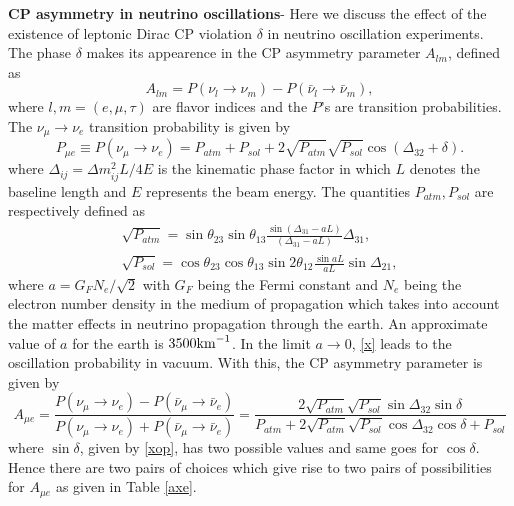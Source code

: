 \documentclass[11pt]{article}
\begin{document}
\textbf{CP asymmetry in neutrino oscillations}- Here we discuss the effect of the existence of leptonic Dirac CP violation $\delta$ in neutrino oscillation experiments. The phase $\delta$ makes its appearence in the CP asymmetry parameter $A_{lm}$, defined as \begin{equation}
A_{lm}=P(\nu_l\to\nu_m)-P(\bar{\nu}_l\to\bar{\nu}_m),
\end{equation} where $l,m=(e,\mu,\tau)$ are flavor indices and the $P$'s are transition probabilities. The $\nu_\mu\to \nu_e$ transition probability is given by \begin{equation}P_{\mu e}\equiv P(\nu_\mu\to\nu_e)=P_{atm}+P_{sol}+2\sqrt{P_{atm}}\sqrt{P_{sol}}\cos(\Delta_{32}+\delta).\label{x}\end{equation} where $\Delta_{ij}=\Delta m^2_{ij}L/4E$ is the kinematic phase factor in which $L$ denotes the baseline length and $E$ represents the beam energy. The quantities $P_{atm},P_{sol}$ are respectively defined as \begin{eqnarray} 
\sqrt{P_{atm}}=\sin\theta_{23}\sin\theta_{13}\frac{\sin(\Delta_{31}-aL)}{(\Delta_{31}-aL)}\Delta_{31},\\
\sqrt{P_{sol}}=\cos\theta_{23}\cos\theta_{13}\sin2\theta_{12}\frac{\sin aL}{aL}\sin\Delta_{21},\end{eqnarray} where $a=G_F N_e/\sqrt{2}$ with $G
_F$ being the Fermi constant and $N_e$ being the electron number density in the medium of propagation which takes into account the matter effects in neutrino propagation through the earth.  An approximate value of $a$ for the earth is $3500{\rm km}^{-1}$. In the limit $a\to 0$, \eqref{x} leads to the oscillation probability in vacuum. With this, the CP asymmetry parameter is given by \begin{equation}
A_{\mu e}=\frac{P(\nu_\mu\to\nu_e)-P(\bar{\nu}_\mu\to\bar{\nu}_e)}{P(\nu_\mu\to\nu_e)+P(\bar{\nu}_\mu\to\bar{\nu}_e)}=
\frac{2\sqrt{P_{atm}}\sqrt{P_{sol}}\sin\Delta_{32}\sin\delta}{P_{atm}+2\sqrt{P_{atm}}\sqrt{P_{sol}}\cos\Delta_{32}\cos\delta+P_{sol}}
\end{equation} where $\sin\delta$, given by \eqref{xop}, has two possible values and same goes for $\cos\delta$. Hence there are two pairs of choices which give rise to two pairs of possibilities for $A_{\mu e}$ as given in Table \ref{axe}.
\end{document}

